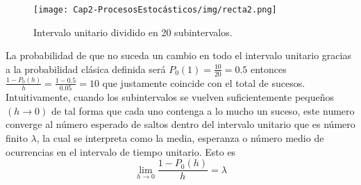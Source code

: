     \begin{center}
        \begin{figure}[htb]
           \texttt{[image: Cap2-ProcesosEstocásticos/img/recta2.png]}
           \caption{Intervalo unitario dividido en 20 subintervalos.}
        \label{figurarecta2}
        \vspace*{0.05in}
        \end{figure}
    \end{center}
    La probabilidad de que no suceda un cambio en todo el intervalo unitario gracias a la probabilidad clásica definida será $P_0(1)=\frac{10}{20}=0.5$ entonces $\frac{1-P_0(h)}{h}=\frac{1-0.5}{0.05}=10$ que justamente coincide con el total de sucesos.\\
    Intuitivamente, cuando los subintervalos se vuelven suficientemente pequeños $(h\rightarrow 0)$ de tal forma que cada uno contenga a lo mucho un suceso, este numero converge al número esperado de saltos dentro del intervalo unitario que es número finito $\lambda$, la cual se interpreta como la media, esperanza o número medio de ocurrencias en el intervalo de tiempo unitario.
    Esto es
    $$  \lim_{h\rightarrow 0}\frac{1-P_0(h)}{h}=\lambda
    $$
  
